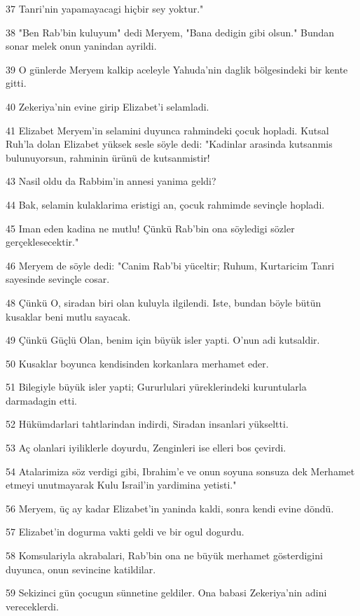 \par 37 Tanri'nin yapamayacagi hiçbir sey yoktur."
\par 38 "Ben Rab'bin kuluyum" dedi Meryem, "Bana dedigin gibi olsun." Bundan sonar melek onun yanindan ayrildi.
\par 39 O günlerde Meryem kalkip aceleyle Yahuda'nin daglik bölgesindeki bir kente gitti.
\par 40 Zekeriya'nin evine girip Elizabet'i selamladi.
\par 41 Elizabet Meryem'in selamini duyunca rahmindeki çocuk hopladi. Kutsal Ruh'la dolan Elizabet yüksek sesle söyle dedi: "Kadinlar arasinda kutsanmis bulunuyorsun, rahminin ürünü de kutsanmistir!
\par 43 Nasil oldu da Rabbim'in annesi yanima geldi?
\par 44 Bak, selamin kulaklarima eristigi an, çocuk rahmimde sevinçle hopladi.
\par 45 Iman eden kadina ne mutlu! Çünkü Rab'bin ona söyledigi sözler gerçeklesecektir."
\par 46 Meryem de söyle dedi: "Canim Rab'bi yüceltir; Ruhum, Kurtaricim Tanri sayesinde sevinçle cosar.
\par 48 Çünkü O, siradan biri olan kuluyla ilgilendi. Iste, bundan böyle bütün kusaklar beni mutlu sayacak.
\par 49 Çünkü Güçlü Olan, benim için büyük isler yapti. O'nun adi kutsaldir.
\par 50 Kusaklar boyunca kendisinden korkanlara merhamet eder.
\par 51 Bilegiyle büyük isler yapti; Gururlulari yüreklerindeki kuruntularla darmadagin etti.
\par 52 Hükümdarlari tahtlarindan indirdi, Siradan insanlari yükseltti.
\par 53 Aç olanlari iyiliklerle doyurdu, Zenginleri ise elleri bos çevirdi.
\par 54 Atalarimiza söz verdigi gibi, Ibrahim'e ve onun soyuna sonsuza dek Merhamet etmeyi unutmayarak Kulu Israil'in yardimina yetisti."
\par 56 Meryem, üç ay kadar Elizabet'in yaninda kaldi, sonra kendi evine döndü.
\par 57 Elizabet'in dogurma vakti geldi ve bir ogul dogurdu.
\par 58 Komsulariyla akrabalari, Rab'bin ona ne büyük merhamet gösterdigini duyunca, onun sevincine katildilar.
\par 59 Sekizinci gün çocugun sünnetine geldiler. Ona babasi Zekeriya'nin adini vereceklerdi.
